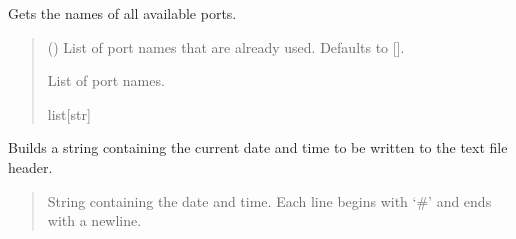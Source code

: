 \documentclass[letterpaper,10pt,english]{sphinxmanual}
\begin{document}
\begin{fulllineitems}
\begin{fulllineitems}
\label{\detokenize{Setup_PodInterface:Setup_PodInterface.Setup_Interface._GetPortsList}}
\pysigstartsignatures
{}
\pysigstopsignatures
\sphinxAtStartPar
Gets the names of all available ports.
\begin{quote}\begin{description}
\sphinxAtStartPar
{} (\sphinxstyleliteralemphasis{\sphinxupquote{{[}}}\sphinxstyleliteralemphasis{\sphinxupquote{{]}}}\sphinxstyleliteralemphasis{\sphinxupquote{, }}) \textendash{} List of port names that are already used. Defaults to {[}{]}.

\sphinxAtStartPar
List of port names.

\sphinxAtStartPar
list{[}str{]}

\end{description}\end{quote}

\end{fulllineitems}


\begin{fulllineitems}
\label{\detokenize{Setup_PodInterface:Setup_PodInterface.Setup_Interface._GetTimeHeader_forTXT}}
\pysigstartsignatures
{}
\pysigstopsignatures
\sphinxAtStartPar
Builds a string containing the current date and time to be written to the text file header.
\begin{quote}\begin{description}
\sphinxAtStartPar
String containing the date and time. Each line begins with ‘\#’ and ends with a newline.


\end{description}
\end{quote}
\end{fulllineitems}
\end{fulllineitems}
\end{document}
